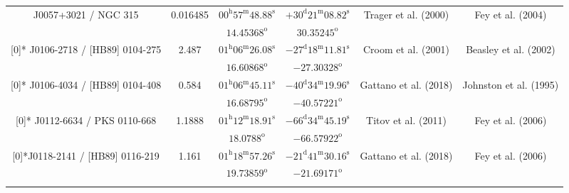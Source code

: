 \begin{landscape}
\begin{longtable}{cccccc}
    \multirow{2}[0]{*}{ J0057+3021 / NGC 315 } & \multirow{2}[0]{*}{ 0.016485 } &  
    $00^\text{h} 57^\text{m} 48.88^\text{s} $  & $+30^\text{d} 21^\text{m} 08.82^\text{s} $ & \multirow{2}[0]{*}{Trager et al. (2000) \cite{RedRef3_2000}} & \multirow{2}[0]{*}{Fey et al. (2004) \cite{CoordRef2_2004}} \\*
        & & $ 14.45368 ^\text{o}$ & $ 30.35245 ^\text{o}$ & & \\ \addlinespace
   
   \multirow{2}[0]{*}{ J0106-2718 / [HB89] 0104-275 } & \multirow{2}[0]{*}{ 2.487 } &  
    $ 01^\text{h}06^\text{m} 26.08^\text{s}$  & $ -27^\text{d}18^\text{m}11.81^\text{s} $  & 
    \multirow{2}[0]{*}{Croom et al. (2001) \cite{RedRef4_2001}} & \multirow{2}[0]{*}{Beasley et al. (2002) \cite{CoordRef4_2002}} \\*
        & & $ 16.60868 ^\text{o}$ & $ -27.30328 ^\text{o}$ & & \\ \addlinespace 
  
  \multirow{2}[0]{*}{ J0106-4034 / [HB89] 0104-408 } & \multirow{2}[0]{*}{ 0.584 } &  
    $01^\text{h} 06^\text{m}45.11^\text{s} $  & $-40^\text{d}34^\text{m} 19.96^\text{s} $  & 
    \multirow{2}[0]{*}{Gattano et al. (2018) \cite{RedRef5_2018}} & \multirow{2}[0]{*}{Johnston et al. (1995) \cite{CoordRef0_1995}} \\*
        & & $ 16.68795 ^\text{o}$ & $ -40.57221 ^\text{o}$ & & \\ \addlinespace
  
  \multirow{2}[0]{*}{ J0112-6634 / PKS 0110-668 } & \multirow{2}[0]{*}{ 1.1888 } &  
    $ 01^\text{h}12^\text{m}18.91^\text{s}$  & $ -66^\text{d}34^\text{m}45.19^\text{s}$  & 
    \multirow{2}[0]{*}{Titov et al. (2011) \cite{RedRef6_2011}} & \multirow{2}[0]{*}{Fey et al. (2006) \cite{CoordRef6_2006}} \\*
        & & $ 18.0788 ^\text{o}$ & $ -66.57922 ^\text{o}$ & & \\ \addlinespace
  
  \multirow{2}[0]{*}{J0118-2141 / [HB89] 0116-219} & \multirow{2}[0]{*}{ 1.161 } &  
    $ 01^\text{h}18^\text{m}57.26^\text{s}$  & $ -21^\text{d}41^\text{m}30.16^\text{s}$  & 
    \multirow{2}[0]{*}{Gattano et al. (2018) \cite{RedRef5_2018}} & \multirow{2}[0]{*}{Fey et al. (2006) \cite{CoordRef6_2006}} \\*
        & & $ 19.73859^\text{o}$ & $ -21.69171^\text{o}$ & & \\ \addlinespace 
        

\end{longtable}
\end{landscape}
